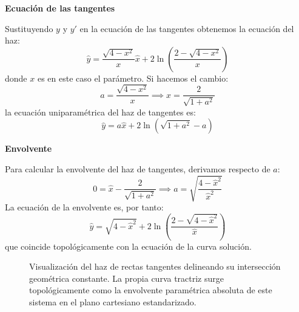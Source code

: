 \documentclass[11pt,a4paper]{article}
\theoremstyle{definition}
\theoremstyle{plain}
\begin{document}
\begin{tcolorbox}
\textbf{Ecuación de las tangentes}

Sustituyendo $y$ y $y'$ en la ecuación de las tangentes obtenemos la ecuación del haz:
$$ \hat{y} = \frac{\sqrt{4-x^2}}{x}\hat{x} + 2\ln\left( \frac{2 - \sqrt{4-x^2}}{x} \right) $$
donde $x$ es en este caso el parámetro. Si hacemos el cambio:
$$ a = \frac{\sqrt{4-x^2}}{x} \implies x = \frac{2}{\sqrt{1+a^2}} $$
la ecuación uniparamétrica del haz de tangentes es:
$$ \hat{y} = a\hat{x} + 2\ln(\sqrt{1+a^2}-a) $$

\textbf{Envolvente}

Para calcular la envolvente del haz de tangentes, derivamos respecto de $a$:
$$ 0 = \hat{x} - \frac{2}{\sqrt{1+a^2}} \implies a = \sqrt{\frac{4-\hat{x}^2}{\hat{x}^2}} $$
La ecuación de la envolvente es, por tanto:
$$ \hat{y} = \sqrt{4-\hat{x}^2} + 2\ln\left( \frac{2 - \sqrt{4-\hat{x}^2}}{\hat{x}} \right) $$
que coincide topológicamente con la ecuación de la curva solución.

\begin{figure}[H]
    \centering
    \caption{Visualización del haz de rectas tangentes delineando su intersección geométrica constante. La propia curva tractriz surge topológicamente como la envolvente paramétrica absoluta de este sistema en el plano cartesiano estandarizado.}
\end{figure}
\end{tcolorbox}
\end{document}

